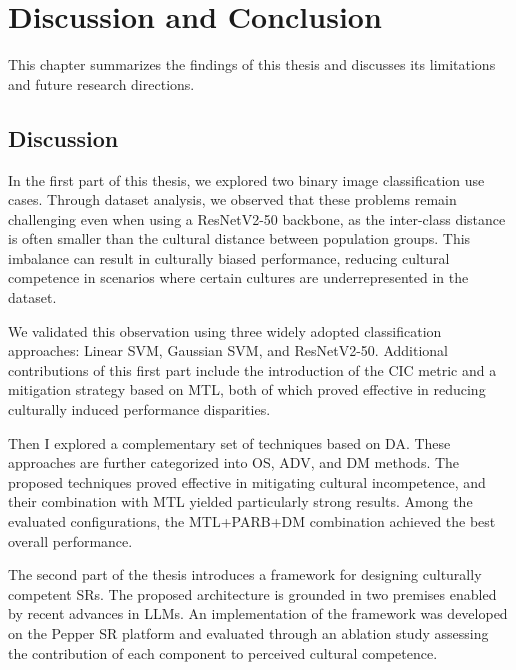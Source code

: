 \chapter{Discussion and Conclusion}
\label{sec:conclusion}

\ifpdf
    \graphicspath{{Chapter10/Figs/Raster/}{Chapter10/Figs/PDF/}{Chapter10/Figs/}}
\else
    \graphicspath{{Chapter10/Figs/Vector/}{Chapter10/Figs/}}
\fi

This chapter summarizes the findings of this thesis and discusses its limitations and future research directions.

\section{Discussion}
\label{ch3:sec:disc}

In the first part of this thesis, we explored two binary image classification use cases. Through dataset analysis, we observed that these problems remain challenging even when using a ResNetV2-50 backbone, as the inter-class distance is often smaller than the cultural distance between population groups. This imbalance can result in culturally biased performance, reducing cultural competence in scenarios where certain cultures are underrepresented in the dataset.

We validated this observation using three widely adopted classification approaches: Linear SVM, Gaussian SVM, and ResNetV2-50. Additional contributions of this first part include the introduction of the CIC metric and a mitigation strategy based on MTL, both of which proved effective in reducing culturally induced performance disparities.

Then I explored a complementary set of techniques based on DA. These approaches are further categorized into OS, ADV, and DM methods. The proposed techniques proved effective in mitigating cultural incompetence, and their combination with MTL yielded particularly strong results. Among the evaluated configurations, the MTL+PARB+DM combination achieved the best overall performance.

The second part of the thesis introduces a framework for designing culturally competent SRs. The proposed architecture is grounded in two premises enabled by recent advances in LLMs. An implementation of the framework was developed on the Pepper SR platform and evaluated through an ablation study assessing the contribution of each component to perceived cultural competence.

